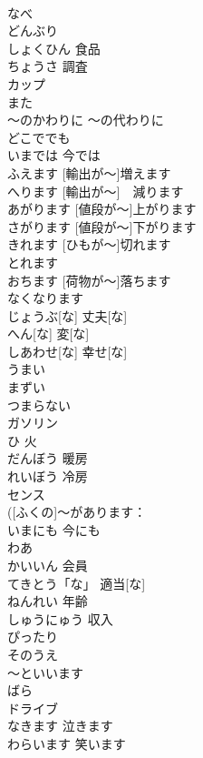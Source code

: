 \documentclass[8pt]{extreport}
\begin{document}
\begin{CJK}{UTF8}{min}
\\	なべ			
\\	どんぶり			
\\	しょくひん	食品	
\\	ちょうさ	調査	
\\	カップ			
\\	また			
\\	～のかわりに	～の代わりに	
\\	どこででも			
\\	いまでは	今では	
\\	[ゆしゅつが～]ふえます	[輸出が～]増えます	
\\	[ゆしゅつが～] へります	[輸出が～]　減ります	
\\	[ねだんが～]あがります	[値段が～]上がります	
\\	[ねだんが～]さがります	[値段が～]下がります	
\\	[ひもが～]きれます	[ひもが～]切れます	
\\	[ボタンが～]とれます			
\\	[にもつが～] おちます	[荷物が～]落ちます	
\\	[ガソリンが～]なくなります			
\\	じょうぶ[な]	丈夫[な]	
\\	へん[な]	変[な]	
\\	しあわせ[な]	幸せ[な]	
\\	うまい			
\\	まずい			
\\	つまらない			
\\	ガソリン			
\\	ひ	火	
\\	だんぼう	暖房	
\\	れいぼう	冷房	
\\	センス			
\\	([ふくの]～があります：
\\	いまにも	今にも	
\\	わあ			
\\	かいいん	会員	
\\	てきとう「な」	適当[な]	
\\	ねんれい	年齢	
\\	しゅうにゅう	収入	
\\	ぴったり			
\\	そのうえ			
\\	～といいます			
\\	ばら			
\\	ドライブ			
\\	なきます	泣きます	
\\	わらいます	笑います	

\end{CJK}
\end{document}
